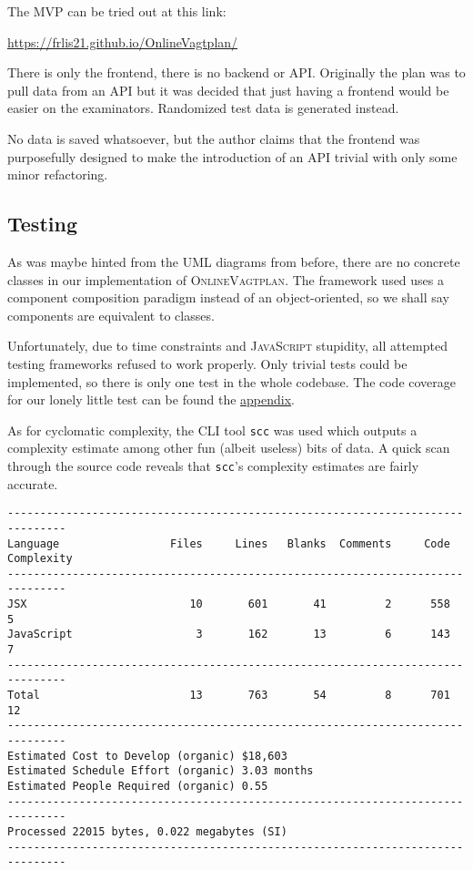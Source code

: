 The MVP can be tried out at this link:
\begin{center}
	\url{https://frlis21.github.io/OnlineVagtplan/}
\end{center}
There is only the frontend, there is no backend or API.
Originally the plan was to pull data from an API
but it was decided that just having a frontend
would be easier on the examinators.
Randomized test data is generated instead.

No data is saved whatsoever,
but the author claims that the frontend was purposefully designed
to make the introduction of an API trivial
with only some minor refactoring.

\subsection*{Testing}

As was maybe hinted from the UML diagrams from before,
there are no concrete classes in our implementation of \textsc{OnlineVagtplan}.
The framework used uses a component composition paradigm
instead of an object-oriented,
so we shall say components are equivalent to classes.

Unfortunately, due to time constraints
and \textsc{JavaScript} stupidity,
all attempted testing frameworks refused to work properly.
Only trivial tests could be implemented,
so there is only one test in the whole codebase.
The code coverage for our lonely little test can be found the
\hyperref[appendix:coverage]{appendix}.

As for cyclomatic complexity,
the CLI tool \texttt{scc} was used
which outputs a complexity estimate
among other fun
(albeit useless)
bits of data.
A quick scan through the source code
reveals that \texttt{scc}'s complexity estimates
are fairly accurate.

\begin{center}
	\label{cmd:scc}
	\begin{verbatim}
-------------------------------------------------------------------------------
Language                 Files     Lines   Blanks  Comments     Code Complexity
-------------------------------------------------------------------------------
JSX                         10       601       41         2      558          5
JavaScript                   3       162       13         6      143          7
-------------------------------------------------------------------------------
Total                       13       763       54         8      701         12
-------------------------------------------------------------------------------
Estimated Cost to Develop (organic) $18,603
Estimated Schedule Effort (organic) 3.03 months
Estimated People Required (organic) 0.55
-------------------------------------------------------------------------------
Processed 22015 bytes, 0.022 megabytes (SI)
-------------------------------------------------------------------------------
\end{verbatim}
\end{center}

